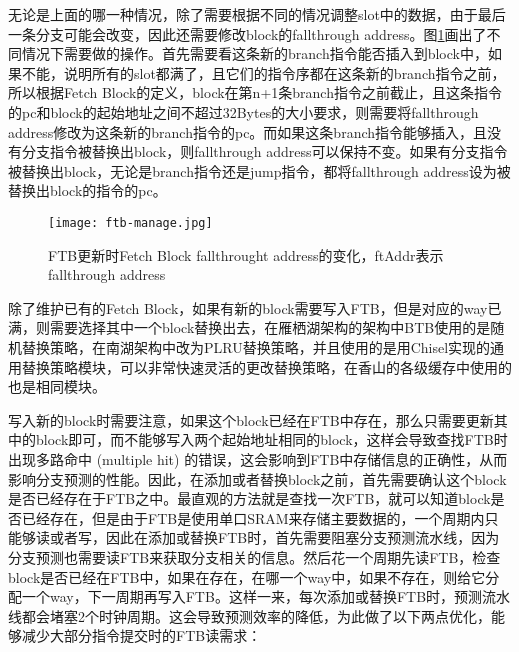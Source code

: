 
无论是上面的哪一种情况，除了需要根据不同的情况调整slot中的数据，由于最后一条分支可能会改变，因此还需要修改block的fallthrough address。图\ref{fig:figure32}画出了不同情况下需要做的操作。首先需要看这条新的branch指令能否插入到block中，如果不能，说明所有的slot都满了，且它们的指令序都在这条新的branch指令之前，所以根据Fetch Block的定义，block在第n+1条branch指令之前截止，且这条指令的pc和block的起始地址之间不超过32Bytes的大小要求，则需要将fallthrough address修改为这条新的branch指令的pc。而如果这条branch指令能够插入，且没有分支指令被替换出block，则fallthrough address可以保持不变。如果有分支指令被替换出block，无论是branch指令还是jump指令，都将fallthrough address设为被替换出block的指令的pc。

\begin{figure}[htb]
	\centering
	\setlength\tabcolsep{3pt}  %
	\vspace{5pt} %
	\texttt{[image: ftb-manage.jpg]}
	\caption{FTB更新时Fetch Block fallthrought address的变化，ftAddr表示fallthrough address}
	\label{fig:figure32}
\end{figure}

除了维护已有的Fetch Block，如果有新的block需要写入FTB，但是对应的way已满，则需要选择其中一个block替换出去，在雁栖湖架构的架构中BTB使用的是随机替换策略，在南湖架构中改为PLRU替换策略，并且使用的是用Chisel实现的通用替换策略模块，可以非常快速灵活的更改替换策略，在香山的各级缓存中使用的也是相同模块。

写入新的block时需要注意，如果这个block已经在FTB中存在，那么只需要更新其中的block即可，而不能够写入两个起始地址相同的block，这样会导致查找FTB时出现多路命中 (multiple hit) 的错误，这会影响到FTB中存储信息的正确性，从而影响分支预测的性能。因此，在添加或者替换block之前，首先需要确认这个block是否已经存在于FTB之中。最直观的方法就是查找一次FTB，就可以知道block是否已经存在，但是由于FTB是使用单口SRAM来存储主要数据的，一个周期内只能够读或者写，因此在添加或替换FTB时，首先需要阻塞分支预测流水线，因为分支预测也需要读FTB来获取分支相关的信息。然后花一个周期先读FTB，检查block是否已经在FTB中，如果在存在，在哪一个way中，如果不存在，则给它分配一个way，下一周期再写入FTB。这样一来，每次添加或替换FTB时，预测流水线都会堵塞2个时钟周期。这会导致预测效率的降低，为此做了以下两点优化，能够减少大部分指令提交时的FTB读需求：

